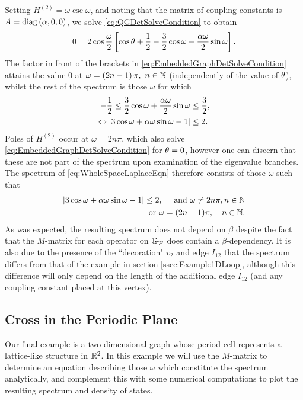 Setting $H^{(2)} = \omega\csc\omega$, and noting that the matrix of coupling constants is $A=\mathrm{diag}\left( \alpha, 0, 0 \right)$, we solve \eqref{eq:QGDetSolveCondition} to obtain
\begin{align} \label{eq:EmbeddedGraphDetSolveCondition}
	0 = 2\cos\frac{\omega}{2}\left[  \cos\theta + \frac{1}{2} - \frac{3}{2}\cos\omega - \frac{\alpha\omega}{2}\sin\omega  \right].
\end{align}
The factor in front of the brackets in \eqref{eq:EmbeddedGraphDetSolveCondition} attains the value 0 at $\omega=\left( 2n-1 \right)\pi, \ n\in\mathbb{N}$ (independently of the value of $\theta$), whilst the rest of the spectrum is those $\omega$ for which
\begin{align*}
	-\frac{1}{2} \leq \frac{3}{2}\cos\omega + \frac{\alpha\omega}{2}\sin\omega & \leq \frac{3}{2}, \\
	\Leftrightarrow \left\lvert  3\cos\omega + \alpha\omega\sin\omega - 1  \right\rvert &\leq 2. 
\end{align*}
Poles of $H^{(2)}$ occur at $\omega= 2n\pi$, which also solve \eqref{eq:EmbeddedGraphDetSolveCondition} for $\theta=0$, however one can discern that these are not part of the spectrum upon examination of the eigenvalue branches.
The spectrum of \eqref{eq:WholeSpaceLaplaceEqn} therefore consists of those $\omega$ such that
\begin{align*}
	\left\lvert  3\cos\omega + \alpha\omega\sin\omega - 1  \right\rvert \leq 2,
	\quad\text{ and }\omega\neq 2n\pi, n\in\mathbb{N} \\
	\text{or} \ \omega = (2n-1)\pi, \quad n\in\mathbb{N}.
\end{align*}
As was expected, the resulting spectrum does not depend on $\beta$ despite the fact that the $M$-matrix for each operator on $\mathbb{G}_{\mathcal{P}}$ does contain a $\beta$-dependency.
It is also due to the presence of the ``decoration" $v_2$ and edge $I_{12}$ that the spectrum differs from that of the example in section \ref{ssec:Example1DLoop}, although this difference will only depend on the length of the additional edge $I_{12}$ (and any coupling constant placed at this vertex).

\subsection{Cross in the Periodic Plane} \label{ssec:ExampleCrossInPlane}
Our final example is a two-dimensional graph whose period cell represents a lattice-like structure in $\mathbb{R}^2$.
In this example we will use the $M$-matrix to determine an equation describing those $\omega$ which constitute the spectrum analytically, and complement this with some numerical computations to plot the resulting spectrum and density of states.

